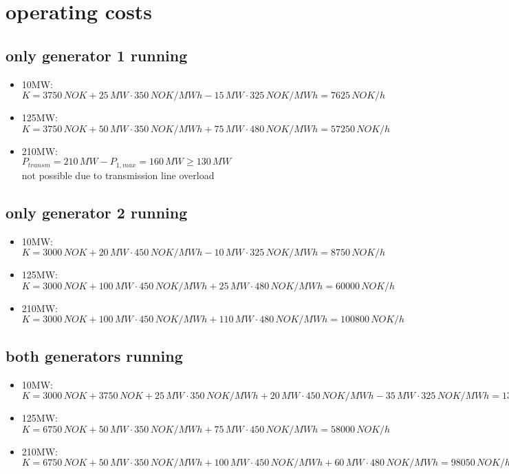 \documentclass{article}
\begin{document}
	\section{operating costs}
		\subsection{only generator 1 running}
			\begin{itemize}
				\item 10MW:\\
					$K=3750\,NOK+25\,MW\cdot 350\,NOK/MWh-15\,MW\cdot 325\,NOK/MWh=7625\,NOK/h$
				\item 125MW:\\
					$K=3750\,NOK+50\,MW\cdot 350\,NOK/MWh+75\,MW\cdot 480\,NOK/MWh=57250\,NOK/h$
				\item 210MW:\\
					$P_{transm}=210\,MW-P_{1,max}=160\,MW\geq 130\,MW$\\
					not possible due to transmission line overload
			\end{itemize}

		\subsection{only generator 2 running}
			\begin{itemize}
				\item 10MW:\\
					$K=3000\,NOK+20\,MW\cdot 450\,NOK/MWh-10\,MW\cdot 325\,NOK/MWh=8750\,NOK/h$
				\item 125MW:\\
					$K=3000\,NOK+100\,MW\cdot 450\,NOK/MWh+25\,MW\cdot 480\,NOK/MWh=60000\,NOK/h$
				\item 210MW:\\
					$K=3000\,NOK+100\,MW\cdot 450\,NOK/MWh+110\,MW\cdot 480\,NOK/MWh=100800\,NOK/h$
			\end{itemize}

		\subsection{both generators running}
			\begin{itemize}
				\item 10MW:\\
					$K=3000\,NOK+3750\,NOK+25\,MW\cdot 350\,NOK/MWh+20\,MW\cdot 450\,NOK/MWh-35\,MW\cdot 325\,NOK/MWh=13125\,NOK/h$
				\item 125MW:\\
					$K=6750\,NOK+50\,MW\cdot 350\,NOK/MWh+75\,MW\cdot 450\,NOK/MWh=58000\,NOK/h$
				\item 210MW:\\
					$K=6750\,NOK+50\,MW\cdot 350\,NOK/MWh+100\,MW\cdot 450\,NOK/MWh+60\,MW\cdot 480\,NOK/MWh=98050\,NOK/h$
			\end{itemize}
\end{document}
